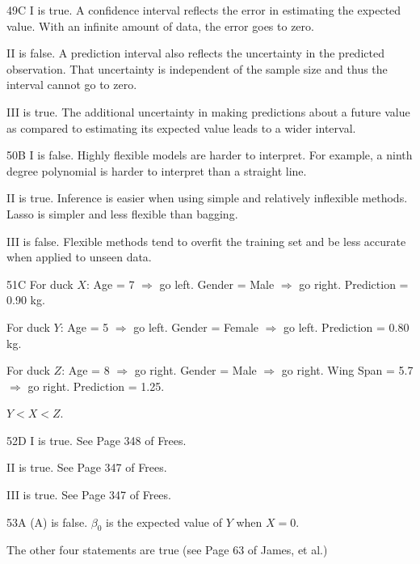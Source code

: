 \begin{solution}{49}{C}
I is true. A confidence interval reflects the error in estimating the expected value. With an infinite amount of data, the error goes to zero.

II is false. A prediction interval also reflects the uncertainty in the predicted observation. That uncertainty is independent of the sample size and thus the interval cannot go to zero.

III is true. The additional uncertainty in making predictions about a future value as compared to estimating its expected value leads to a wider interval.
\end{solution}

\begin{solution}{50}{B}
I is false. Highly flexible models are harder to interpret. For example, a ninth degree polynomial is harder to interpret than a straight line.

II is true. Inference is easier when using simple and relatively inflexible methods. Lasso is simpler and less flexible than bagging.

III is false. Flexible methods tend to overfit the training set and be less accurate when applied to unseen data.
\end{solution}

\begin{solution}{51}{C}
For duck $X$: Age = 7 $\Rightarrow$ go left. Gender = Male $\Rightarrow$ go right. Prediction = 0.90 kg.

For duck $Y$: Age = 5 $\Rightarrow$ go left. Gender = Female $\Rightarrow$ go left. Prediction = 0.80 kg.

For duck $Z$: Age = 8 $\Rightarrow$ go right. Gender = Male $\Rightarrow$ go right. Wing Span = 5.7 $\Rightarrow$ go right.
Prediction = 1.25.

$Y < X < Z$.
\end{solution}

\begin{solution}{52}{D}
I is true. See Page 348 of Frees.

II is true. See Page 347 of Frees.

III is true. See Page 347 of Frees.
\end{solution}

\begin{solution}{53}{A}
(A) is false. $\beta_0$ is the expected value of $Y$ when $X = 0$.

The other four statements are true (see Page 63 of James, et al.)
\end{solution}

